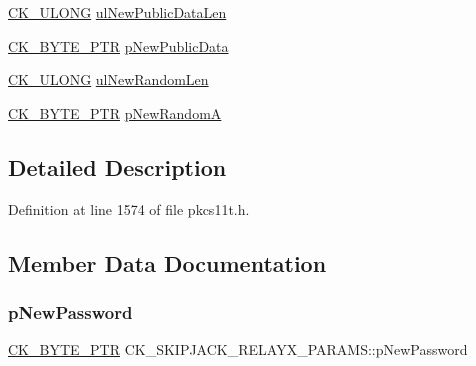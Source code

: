 \begin{DoxyCompactItemize}
\item 
\hyperlink{pkcs11t_8h_a35181858a3b7a0a81f49d180d8f446ef}{C\+K\+\_\+\+U\+L\+O\+NG} \hyperlink{struct_c_k___s_k_i_p_j_a_c_k___r_e_l_a_y_x___p_a_r_a_m_s_ae8cf50e7d1ad0f0320761f4657a649ba}{ul\+New\+Public\+Data\+Len}
\item 
\hyperlink{pkcs11t_8h_a3d7233a4077fbaf7ae76b64da0a62a21}{C\+K\+\_\+\+B\+Y\+T\+E\+\_\+\+P\+TR} \hyperlink{struct_c_k___s_k_i_p_j_a_c_k___r_e_l_a_y_x___p_a_r_a_m_s_aa9b447dbf217bfb55fe13f3d0bbc5a45}{p\+New\+Public\+Data}
\item 
\hyperlink{pkcs11t_8h_a35181858a3b7a0a81f49d180d8f446ef}{C\+K\+\_\+\+U\+L\+O\+NG} \hyperlink{struct_c_k___s_k_i_p_j_a_c_k___r_e_l_a_y_x___p_a_r_a_m_s_a4e7516cf5b540f26f34e456456177a96}{ul\+New\+Random\+Len}
\item 
\hyperlink{pkcs11t_8h_a3d7233a4077fbaf7ae76b64da0a62a21}{C\+K\+\_\+\+B\+Y\+T\+E\+\_\+\+P\+TR} \hyperlink{struct_c_k___s_k_i_p_j_a_c_k___r_e_l_a_y_x___p_a_r_a_m_s_acd5cfdff0433d3c431f883ffdb8d941b}{p\+New\+RandomA}
\end{DoxyCompactItemize}


\subsection{Detailed Description}


Definition at line 1574 of file pkcs11t.\+h.



\subsection{Member Data Documentation}
\mbox{\label{struct_c_k___s_k_i_p_j_a_c_k___r_e_l_a_y_x___p_a_r_a_m_s_a7ebb58594ac729d26b00c4dc7f3a17c6}} 
\subsubsection{\texorpdfstring{p\+New\+Password}{pNewPassword}}
{\footnotesize\ttfamily \hyperlink{pkcs11t_8h_a3d7233a4077fbaf7ae76b64da0a62a21}{C\+K\+\_\+\+B\+Y\+T\+E\+\_\+\+P\+TR} C\+K\+\_\+\+S\+K\+I\+P\+J\+A\+C\+K\+\_\+\+R\+E\+L\+A\+Y\+X\+\_\+\+P\+A\+R\+A\+M\+S\+::p\+New\+Password}



